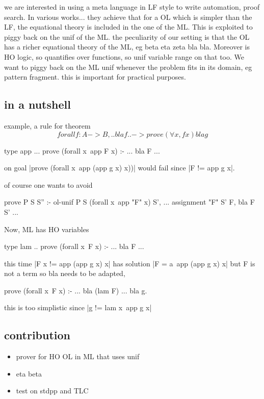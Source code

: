 \documentclass{rapport}
\begin{document}
we are interested in using a meta language in LF style to write
automation, proof search. In various works... they achieve that
for a OL which is simpler than the LF, the equational theory is included
in the one of the ML. This is exploited to piggy back on the unif
of the ML.
the peculiarity of our setting is that the OL has a richer equational
theory of the ML, eg beta eta zeta bla bla. Moreover is HO logic, so
quantifies over functions, so unif variable range on that too.
We want to piggy back on the ML unif whenever the problem fits
in its domain, eg pattern fragment.
this is important for practical purposes.

\subsection{in a nutshell}
example, a rule for theorem
$$
forall f : A -> B, .. bla f .. -> prove (\forall x, f x)
bla g
$$
\begin{elpicode}
type app ...
prove (forall x\ app F x) :- ... bla F ...
\end{elpicode}
on goal |prove (forall x\ app (app g x) x))|
would fail since |F != app g x|.

of course one wants to avoid
\begin{elpicode}
prove P S S'' :- ol-unif P S (forall x\ app "F" x) S', ... assignment "F" S' F, bla F S' ...
\end{elpicode}

Now, ML has HO variables
\begin{elpicode}
type lam ..
prove (forall x\ F x) :- ... bla F ...
\end{elpicode}
this time  |F x != app (app g x) x| has solution
|F = a\ app (app g x) x| but F is not a term so
bla needs to be adapted,
\begin{elpicode}
prove (forall x\ F x) :- ... bla (lam F) ...
bla g.
\end{elpicode}
this is too simplistic since |g != lam x\ app g x|

\subsection{contribution}
\begin{itemize}
\item prover for HO OL in ML that uses unif
\item eta beta
\item test on stdpp and TLC
\end{itemize}
\end{document}
